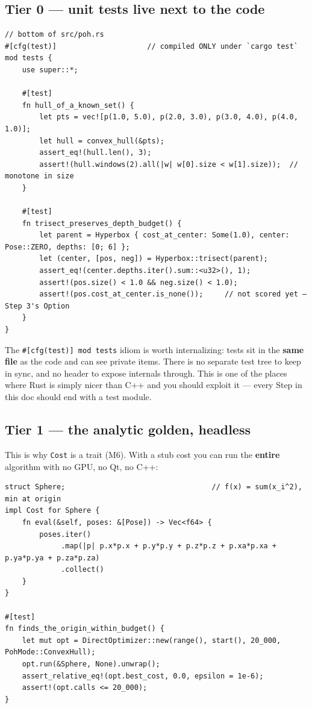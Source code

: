 \documentclass[11pt]{article}
\begin{document}
\subsection{Tier 0 — unit tests live next to the code}
\label{sec:orgd955d62}

\begin{verbatim}
// bottom of src/poh.rs
#[cfg(test)]                     // compiled ONLY under `cargo test`
mod tests {
    use super::*;

    #[test]
    fn hull_of_a_known_set() {
        let pts = vec![p(1.0, 5.0), p(2.0, 3.0), p(3.0, 4.0), p(4.0, 1.0)];
        let hull = convex_hull(&pts);
        assert_eq!(hull.len(), 3);
        assert!(hull.windows(2).all(|w| w[0].size < w[1].size));  // monotone in size
    }

    #[test]
    fn trisect_preserves_depth_budget() {
        let parent = Hyperbox { cost_at_center: Some(1.0), center: Pose::ZERO, depths: [0; 6] };
        let (center, [pos, neg]) = Hyperbox::trisect(parent);
        assert_eq!(center.depths.iter().sum::<u32>(), 1);
        assert!(pos.size() < 1.0 && neg.size() < 1.0);
        assert!(pos.cost_at_center.is_none());     // not scored yet — Step 3's Option
    }
}
\end{verbatim}

The \texttt{\#[cfg(test)] mod tests} idiom is worth internalizing: tests sit in the
\textbf{same file} as the code and can see private items. There is no separate test
tree to keep in sync, and no header to expose internals through. This is one of
the places where Rust is simply nicer than C++ and you should exploit it —
every Step in this doc should end with a test module.
\subsection{Tier 1 — the analytic golden, headless}
\label{sec:org59b7e96}

This is why \texttt{Cost} is a trait (M6). With a stub cost you can run the \textbf{entire}
algorithm with no GPU, no Qt, no C++:

\begin{verbatim}
struct Sphere;                                  // f(x) = sum(x_i^2), min at origin
impl Cost for Sphere {
    fn eval(&self, poses: &[Pose]) -> Vec<f64> {
        poses.iter()
             .map(|p| p.x*p.x + p.y*p.y + p.z*p.z + p.xa*p.xa + p.ya*p.ya + p.za*p.za)
             .collect()
    }
}

#[test]
fn finds_the_origin_within_budget() {
    let mut opt = DirectOptimizer::new(range(), start(), 20_000, PohMode::ConvexHull);
    opt.run(&Sphere, None).unwrap();
    assert_relative_eq!(opt.best_cost, 0.0, epsilon = 1e-6);
    assert!(opt.calls <= 20_000);
}
\end{verbatim}
\end{document}
